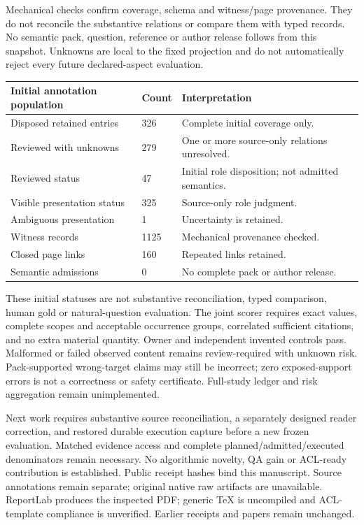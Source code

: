 \documentclass[10pt,a4paper]{article}
\begin{document}
Mechanical checks confirm coverage, schema and witness/page provenance. They do not reconcile the substantive relations or compare them with typed records. No semantic pack, question, reference or author release follows from this snapshot. Unknowns are local to the fixed projection and do not automatically reject every future declared-aspect evaluation.

\begin{longtable}{@{}p{}p{}p{}@{}}\toprule
\textbf{Initial annotation population} & \textbf{Count} & \textbf{Interpretation} \\ \midrule\endhead
Disposed retained entries & 326 & Complete initial coverage only. \\
Reviewed with unknowns & 279 & One or more source-only relations unresolved. \\
Reviewed status & 47 & Initial role disposition; not admitted semantics. \\
Visible presentation status & 325 & Source-only role judgment. \\
Ambiguous presentation & 1 & Uncertainty is retained. \\
Witness records & 1125 & Mechanical provenance checked. \\
Closed page links & 160 & Repeated links retained. \\
Semantic admissions & 0 & No complete pack or author release. \\
\bottomrule\end{longtable}
{\small These initial statuses are not substantive reconciliation, typed comparison, human gold or natural-question evaluation.}
The joint scorer requires exact values, complete scopes and acceptable occurrence groups, correlated sufficient citations, and no extra material quantity. Owner and independent invented controls pass. Malformed or failed observed content remains review-required with unknown risk. Pack-supported wrong-target claims may still be incorrect; zero exposed-support errors is not a correctness or safety certificate. Full-study ledger and risk aggregation remain unimplemented.

Next work requires substantive source reconciliation, a separately designed reader correction, and restored durable execution capture before a new frozen evaluation. Matched evidence access and complete planned/admitted/executed denominators remain necessary. No algorithmic novelty, QA gain or ACL-ready contribution is established. Public receipt hashes bind this manuscript. Source annotations remain separate; original native raw artifacts are unavailable. ReportLab produces the inspected PDF; generic TeX is uncompiled and ACL-template compliance is unverified. Earlier receipts and papers remain unchanged.
\end{document}
